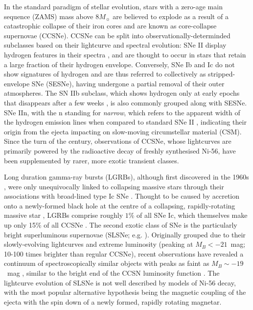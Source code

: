 \documentclass[fleqn,usenatbib,]{mnras}
\begin{document}
In the standard paradigm of stellar evolution, stars with a zero-age main sequence (ZAMS) mass above $8M_{\sun}$ are believed to explode as a result of a catastrophic collapse of their iron cores and are known as core-collapse supernovae (CCSNe). CCSNe can be split into observationally-determinded subclasses based on their lightcurve and spectral evolution: SNe II display hydrogen features in their spectra \citep{Minkowski1941}, and are thought to occur in stars that retain a large fraction of their hydrogen envelope. Conversely, SNe Ib and Ic do not show signatures of hydrogen \citep[e.g.][]{Filippenko1997} and are thus referred to collectively as stripped-envelope SNe (SESNe), having undergone a partial removal of their outer atmospheres. The SN IIb subclass, which shows hydrogen only at early epochs that disappears after a few weeks \citep{Filippenko1988}, is also commonly grouped along with SESNe. SNe IIn, with the n standing for \textit{narrow}, which refers to the apparent width of the hydrogen emission lines when compared to standard SNe II \citep{Schlegel1990}, indicating their origin from the ejecta impacting on slow-moving circumstellar material (CSM). Since the turn of the century, observations of CCSNe, whose lightcurves are primarily powered by the radioactive decay of freshly synthesised Ni-56, have been supplemented by rarer, more exotic transient classes.

 Long duration gamma-ray bursts (LGRBs), although first discovered in the 1960s \citep{Klebesadel1973}, were only unequivocally linked to collapsing massive stars through their associations with broad-lined type Ic SNe \citep{Galama1998,Hjorth2003}. Thought to be caused by accretion onto a newly-formed black hole at the centre of a collapsing, rapidly-rotating massive star \citep[e.g.][]{Woosley1993,Woosley2006a,Woosley2006b}, LGRBs comprise roughly $1\%$ of all SNe Ic, which themselves make up only 15\% of all CCSNe \citep{Kelly2012,Graham2016}. The second exotic class of SNe is the particularly bright superluminous supernovae (SLSNe; e.g. \citealt{Quimby2011, Gal-Yam2012}). Originally grouped due to their slowly-evolving lightcurves and extreme luminosity (peaking at $M_B < -21$~mag; 10-100 times brighter than regular CCSNe), recent observations have revealed a continuum of spectroscopically similar objects with peaks as faint as $M_B \sim -19$~mag \citep{DeCia2018,Lunnan2018,Angus2019}, similar to the bright end of the CCSN luminosity function \citep{Li2011}. The lightcurve evolution of SLSNe is not well described by models of Ni-56 decay, with the most popular alternative hypothesis being the magnetic coupling of the ejecta with the spin down of a newly formed, rapidly rotating magnetar.
 
\end{document}

